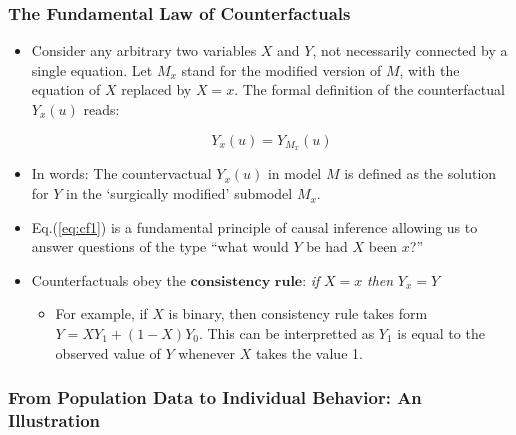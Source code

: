 \documentclass[]{article}
\providecommand{\tightlist}{%
  \setlength{\itemsep}{0pt}\setlength{\parskip}{0pt}}
\begin{document}
\subsubsection{The Fundamental Law of
Counterfactuals}\label{the-fundamental-law-of-counterfactuals}

\begin{itemize}
\item
  Consider any arbitrary two variables \(X\) and \(Y\), not necessarily
  connected by a single equation. Let \(M_x\) stand for the modified
  version of \(M\), with the equation of \(X\) replaced by \(X = x\).
  The formal definition of the counterfactual \(Y_x(u)\) reads:

  \begin{equation}\label{eq:cf1}
  Y_x(u) = Y_{M_x}(u)
  \end{equation}
\item
  In words: The countervactual \(Y_x(u)\) in model \(M\) is defined as
  the solution for \(Y\) in the `surgically modified' submodel \(M_x\).
\item
  Eq.(\ref{eq:cf1}) is a fundamental principle of causal inference
  allowing us to answer questions of the type ``what would \(Y\) be had
  \(X\) been \(x\)?''
\item
  Counterfactuals obey the \(\textbf{consistency rule}\): \emph{if}
  \(X = x\) \emph{then} \(Y_x = Y\)

  \begin{itemize}
  \tightlist
  \item
    For example, if \(X\) is binary, then consistency rule takes form
    \(Y = XY_1 + (1 - X)Y_0\). This can be interpretted as \(Y_1\) is
    equal to the observed value of \(Y\) whenever \(X\) takes the value
    1.
  \end{itemize}
\end{itemize}

\subsubsection{From Population Data to Individual Behavior: An
Illustration}\label{from-population-data-to-individual-behavior-an-illustration}
\end{document}
